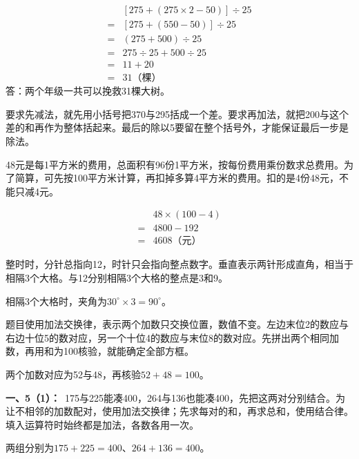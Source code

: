 \documentclass[multi=snippet,border=0pt]{standalone}
\newenvironment{snippet}[3]{\begin{minipage}{#1bp}\color{answerred}\fontsize{#2}{#3}\selectfont\raggedright}{\end{minipage}}
\begin{document}
\begin{snippet}{356}{10.5}{12.8}\[\begin{aligned}&[275+(275\times2-50)]\div25\\={}&[275+(550-50)]\div25\\={}&(275+500)\div25\\={}&275\div25+500\div25\\={}&11+20\\={}&31\text{（棵）}\end{aligned}\]答：两个年级一共可以挽救31棵大树。\end{snippet}
\begin{snippet}{505}{11.5}{14}要求先减法，就先用小括号把370与295括成一个差。要求再加法，就把200与这个差的和再作为整体括起来。最后的除以5要留在整个括号外，才能保证最后一步是除法。\end{snippet}
\begin{snippet}{505}{11.5}{14}48元是每1平方米的费用，总面积有96份1平方米，按每份费用乘份数求总费用。为了简算，可先按100平方米计算，再扣掉多算4平方米的费用。扣的是4份48元，不能只减4元。\par \[\begin{aligned}&48\times(100-4)\\={}&4800-192\\={}&4608\text{（元）}\end{aligned}\]\end{snippet}
\begin{snippet}{505}{11.5}{14}整时时，分针总指向12，时针只会指向整点数字。垂直表示两针形成直角，相当于相隔3个大格。与12分别相隔3个大格的整点是3和9。\par 相隔3个大格时，夹角为\(30^\circ\times3=90^\circ\)。\end{snippet}
\begin{snippet}{505}{11.5}{14}题目使用加法交换律，表示两个加数只交换位置，数值不变。左边末位2的数应与右边十位5的数对应，另一个十位4的数应与末位8的数对应。先拼出两个相同加数，再用和为100核验，就能确定全部方框。\par 两个加数对应为52与48，再核验\(52+48=100\)。\end{snippet}
\begin{snippet}{505}{11.5}{14}\textbf{一、5（1）：}\ 175与225能凑400，264与136也能凑400，先把这两对分别结合。为让不相邻的加数配对，使用加法交换律；先求每对的和，再求总和，使用结合律。填入运算符时始终都是加法，各数各用一次。\par 两组分别为\(175+225=400\)、\(264+136=400\)。\end{snippet}
\end{document}
